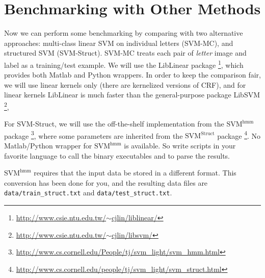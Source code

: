 \documentclass[11pt]{report}
\begin{document}
\section{Benchmarking with Other Methods}

Now we can perform some benchmarking by comparing with two alternative approaches:
multi-class linear SVM on individual letters (SVM-MC),
and structured SVM (SVM-Struct).
SVM-MC treats each pair of \emph{letter} image and label as a training/test example.
We will use the LibLinear package%
\footnote{\href{http://www.csie.ntu.edu.tw/~cjlin/liblinear/}{http://www.csie.ntu.edu.tw/$\sim$cjlin/liblinear/}},
which provides both Matlab and Python wrappers.
In order to keep the comparison fair,
we will use linear kernels only (there are kernelized versions of CRF),
and for linear kernels LibLinear is much faster than the general-purpose package LibSVM%
\footnote{\href{http://www.csie.ntu.edu.tw/~cjlin/libsvm/}{http://www.csie.ntu.edu.tw/$\sim$cjlin/libsvm/}},


For SVM-Struct, we will use the off-the-shelf implementation from the $\text{SVM}^{\text{hmm}}$ package%
\footnote{\href{http://www.cs.cornell.edu/People/tj/svm_light/svm_hmm.html}{http://www.cs.cornell.edu/People/tj/svm\_light/svm\_hmm.html}},
where some parameters are inherited from the $\text{SVM}^{\text{Struct}}$ package%
\footnote{\href{http://www.cs.cornell.edu/people/tj/svm_light/svm_struct.html}{http://www.cs.cornell.edu/people/tj/svm\_light/svm\_struct.html}}.
No Matlab/Python wrapper for $\text{SVM}^{\text{hmm}}$ is available.
So write scripts in your favorite language to call the binary executables and to parse the results.


$\text{SVM}^{\text{hmm}}$ requires that the input data be stored in a different format.
This conversion has been done for you, and the resulting data files are \verb#data/train_struct.txt# and \verb#data/test_struct.txt#.
\end{document}
